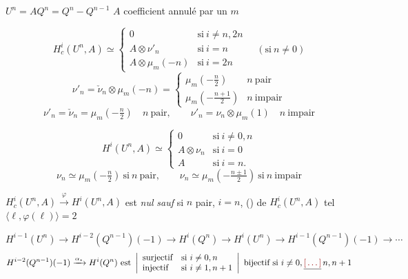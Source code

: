 \documentclass[11pt,a4paper]{article}
\begin{document}
$U^n = AQ^n = Q^n - Q^{n-1}$ \quad {} $A$ coefficient annulé par
un $m$

\[
  H^i_c(U^n, A) \simeq
  \left\{
  \begin{array}{ll}
    0 & \text{si}\ i \neq n, 2n \\
    A \otimes \nu'_n & \text{si}\ i = n \\
    A \otimes \mu_m(-n) & \text{si}\ i = 2n
  \end{array}
  \right.
  \quad (\text{si}\ n \neq 0)
\]
\[
  \nu'_n = \check{\nu}_n \otimes \mu_m(-n) =
  \left\{
  \begin{array}{ll}
    \mu_m(-\tfrac{n}{2}) & n\ \text{pair} \\
    \mu_m(-\tfrac{n+1}{2}) & n\ \text{impair}
  \end{array}
  \right.
\]
\[
  \nu'_n = \check{\nu}_n = \mu_m(-\tfrac{n}{2}) \quad n\ \text{pair}, \qquad
  \nu'_n = \nu_n \otimes \mu_m(1) \quad n\ \text{impair}
\]


\[
  H^i(U^n, A) \simeq
  \left\{
  \begin{array}{ll}
    0 & \text{si}\ i \neq 0, n \\
    A \otimes \nu_n & \text{si}\ i = 0 \\
    A & \text{si}\ i = n .
  \end{array}
  \right.
\]
\[
  \nu_n \simeq \mu_m(-\tfrac{n}{2}) \ \text{si}\ n\ \text{pair}, \qquad
  \nu_n \simeq \mu_m(-\tfrac{n \pm 1}{2}) \ \text{si}\ n\ \text{impair}
\]

$H^i_c(U^n, A) \xrightarrow{\varphi} H^i(U^n, A)$ est \emph{nul} \emph{sauf} si
$n$ pair, $i = n$, () \ill{} \ill{} \ill{} \ill{}
\ill{} \ill{} de $H^i_c(U^n, A)$ tel 
$\langle \ell, \varphi(\ell) \rangle = 2$

\[
  H^{i-1}(U^n) \to H^{i-2}(Q^{n-1})(-1) \to H^i(Q^n) \to H^i(U^n) \to
  H^{i-1}(Q^{n-1})(-1) \to \cdots
\]
\[
  H^{i-2}(Q^{n-1})(-1) \xrightarrow{\alpha_*} H^i(Q^n) \ \text{est}\
  \left|
  \begin{array}{ll}
    \text{surjectif} & \text{si}\ i \neq 0, n \\
    \text{injectif} & \text{si}\ i \neq 1, n+1
  \end{array}
  \right|
  \ \text{bijectif si}\ i \neq 0, \struck{\ill{}}\, n, n+1
\]
\end{document}

